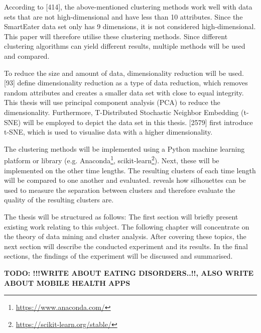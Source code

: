 According to \textcite{han2011data}[414], the above-mentioned clustering methods work well with data sets that are not high-dimensional and have less than 10 attributes. Since the SmartEater data set only has 9 dimensions, it is not considered high-dimensional. This paper will therefore utilise these clustering methods. Since different clustering algorithms can yield different results, multiple methods will be used and compared.

To reduce the size and amount of data, dimensionality reduction will be used. \textcite{han2011data}[93] define dimensionality reduction as a type of data reduction, which removes random attributes and creates a smaller data set with close to equal integrity. This thesis will use principal component analysis (PCA) to reduce the dimensionality.
Furthermore, T-Distributed Stochastic Neighbor Embedding (t-SNE) will be employed to depict the data set in this thesis. \textcite{maaten2008visualizing}[2579] first introduce t-SNE, which is used to visualise data with a higher dimensionality. 

The clustering methods will be implemented using a Python machine learning platform or library (e.g. Anaconda\footnote{\url{https://www.anaconda.com/}}, scikit-learn\footnote{\url{https://scikit-learn.org/stable/}}). Next, these will be implemented on the other time lengths. The resulting clusters of each time length will be compared to one another and evaluated. 
\textcite{rousseeuw1987silhouettes} reveals how silhouettes can be used to measure the separation between clusters and therefore evaluate the quality of the resulting clusters are.



The thesis will be structured as follows: The first section will briefly present existing work relating to this subject. The following chapter will concentrate on the theory of data mining and cluster analysis. After covering these topics, the next section will describe the conducted experiment and its results. In the final sections, the findings of the experiment will be discussed and summarised. 


\textbf{TODO: !!!WRITE ABOUT EATING DISORDERS..!!, ALSO WRITE ABOUT MOBILE HEALTH APPS} %

